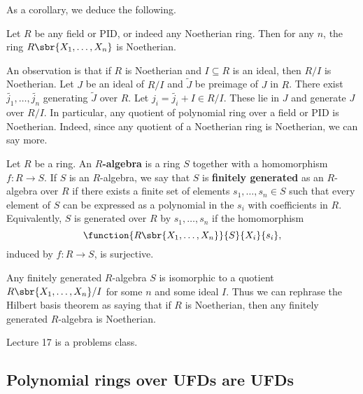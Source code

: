 \pagebreak

As a corollary, we deduce the following.

\begin{corollary}
Let $ R $ be any field or PID, or indeed any Noetherian ring. Then for any $ n $, the ring $ R\sbr{X_1, \dots, X_n} $ is Noetherian.
\end{corollary}

An observation is that if $ R $ is Noetherian and $ I \subseteq R $ is an ideal, then $ R / I $ is Noetherian. Let $ J $ be an ideal of $ R / I $ and $ \widetilde{J} $ be preimage of $ J $ in $ R $. There exist $ \widetilde{j_1}, \dots, \widetilde{j_n} $ generating $ \widetilde{J} $ over $ R $. Let $ j_i = \widetilde{j_i} + I \in R / I $. These lie in $ J $ and generate $ J $ over $ R / I $. In particular, any quotient of polynomial ring over a field or PID is Noetherian. Indeed, since any quotient of a Noetherian ring is Noetherian, we can say more.

\begin{definition}
Let $ R $ be a ring. An \textbf{$ R $-algebra} is a ring $ S $ together with a homomorphism $ f : R \to S $. If $ S $ is an $ R $-algebra, we say that $ S $ is \textbf{finitely generated} as an $ R $-algebra over $ R $ if there exists a finite set of elements $ s_1, \dots, s_n \in S $ such that every element of $ S $ can be expressed as a polynomial in the $ s_i $ with coefficients in $ R $. Equivalently, $ S $ is generated over $ R $ by $ s_1, \dots, s_n $ if the homomorphism
$$ \function{R\sbr{X_1, \dots, X_n}}{S}{X_i}{s_i}, $$
induced by $ f : R \to S $, is surjective.
\end{definition}

\begin{note*}
Any finitely generated $ R $-algebra $ S $ is isomorphic to a quotient $ R\sbr{X_1, \dots, X_n} / I $ for some $ n $ and some ideal $ I $. Thus we can rephrase the Hilbert basis theorem as saying that if $ R $ is Noetherian, then any finitely generated $ R $-algebra is Noetherian.
\end{note*}


Lecture 17 is a problems class.

\subsection{Polynomial rings over UFDs are UFDs}



